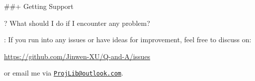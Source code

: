 \documentclass[%
  use style = classical,
  scroll,
]{Q-and-A}
\begin{document}
##+ {Getting Support}

?
  What should I do if I encounter any problem?

:
  If you run into any issues or have ideas for improvement, feel free to discuss on:
  \begin{center}
      \url{https://github.com/Jinwen-XU/Q-and-A/issues}
  \end{center}
  or email me via \href{mailto:ProjLib@outlook.com}{\texttt{ProjLib@outlook.com}}.


\vspace{3\baselineskip}



\end{document}
